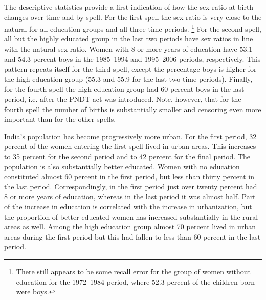 \documentclass[12pt,letterpaper]{article}
\begin{document}
The descriptive statistics provide a first indication of how the
sex ratio at birth changes over time and by spell.
For the first spell the sex ratio is very close to the natural
for all education groups and all three time periods.%
\footnote{
There still appears to be some recall error for the group of women without
education for the 1972--1984 period, where 52.3 percent of the children born were boys.
}
For the second spell, all but the highly educated group in the last two
periods have sex ratios in line with the natural sex ratio.
Women with 8 or more years of education have 53.1 and 54.3 percent
boys in the 1985--1994 and 1995--2006 periods, respectively.
This pattern repeats itself for the third spell, except the percentage
boys is higher for the high education group (55.3 and 55.9 for the last
two time periods).
Finally, for the fourth spell the high education group 
had 60 percent boys in the last period, i.e. after the PNDT act was introduced.
Note, however, that for the fourth spell the number of births is substantially
smaller and censoring even more important than for the other spells.

India's population has become progressively more urban.
For the first period, 32 percent of the women entering the first spell lived in urban areas.
This increases to 35 percent for the second period and to 42 percent for the final period.
The population is also substantially better educated.
Women with no education constituted almost 60 percent 
in the first period, but less than thirty percent in the last period.
Correspondingly, in the first period just over twenty percent had 8 or more 
years of education, whereas in the last period it was almost half.
Part of the increase in education is correlated with the increase in urbanization,
but the proportion of better-educated women has increased substantially
in the rural areas as well.
Among the high education group almost 70 percent lived in urban areas
during the first period but this had fallen to less than 60 percent
in the last period.

\end{document}
